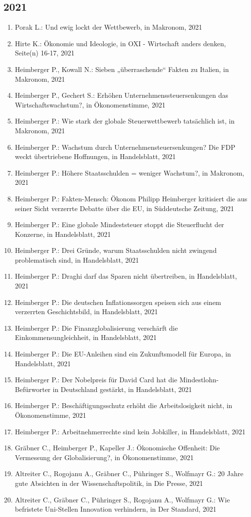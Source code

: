 \subsection*{2021}
\begin{enumerate}
    	 \item Porak L.: Und ewig lockt der Wettbewerb, in Makronom, 2021
	 \item Hirte K.: Ökonomie und Ideologie, in OXI - Wirtschaft anders denken, Seite(n) 16-17, 2021
	 \item Heimberger P., Kowall N.: Sieben „überraschende“ Fakten zu Italien, in Makronom, 2021
	 \item Heimberger P., Gechert S.: Erhöhen Unternehmenssteuersenkungen das Wirtschaftswachstum?, in Ökonomenstimme, 2021
	 \item Heimberger P.: Wie stark der globale Steuerwettbewerb tatsächlich ist, in Makronom, 2021
	 \item Heimberger P.: Wachstum durch Unternehmensteuersenkungen? Die FDP weckt übertriebene Hoffnungen, in Handelsblatt, 2021
	 \item Heimberger P.: Höhere Staatsschulden = weniger Wachstum?, in Makronom, 2021
	 \item Heimberger P.: Fakten-Mensch: Ökonom Philipp Heimberger kritisiert die aus seiner Sicht verzerrte Debatte über die EU, in Süddeutsche Zeitung, 2021
	 \item Heimberger P.: Eine globale Mindeststeuer stoppt die Steuerflucht der Konzerne, in Handelsblatt, 2021
	 \item Heimberger P.: Drei Gründe, warum Staatsschulden nicht zwingend problematisch sind, in Handelsblatt, 2021
	 \item Heimberger P.: Draghi darf das Sparen nicht übertreiben, in Handelsblatt, 2021
	 \item Heimberger P.: Die deutschen Inflationssorgen speisen sich aus einem verzerrten Geschichtsbild, in Handelsblatt, 2021
	 \item Heimberger P.: Die Finanzglobalisierung verschärft die Einkommensungleichheit, in Handelsblatt, 2021
	 \item Heimberger P.: Die EU-Anleihen sind ein Zukunftsmodell für Europa, in Handelsblatt, 2021
	 \item Heimberger P.: Der Nobelpreis für David Card hat die Mindestlohn-Befürworter in Deutschland gestärkt, in Handelsblatt, 2021
	 \item Heimberger P.: Beschäftigungsschutz erhöht die Arbeitslosigkeit nicht, in Ökonomenstimme, 2021
	 \item Heimberger P.: Arbeitnehmerrechte sind kein Jobkiller, in Handelsblatt, 2021
	 \item Gräbner C., Heimberger P., Kapeller J.: Ökonomische Offenheit: Die Vermessung der Globalisierung?, in Ökonomenstimme, 2021
	 \item Altreiter C., Rogojanu A., Gräbner C., Pühringer S., Wolfmayr G.: 20 Jahre gute Absichten in der Wissenschaftspolitik, in Die Presse, 2021
	 \item Altreiter C., Gräbner C., Pühringer S., Rogojanu A., Wolfmayr G.: Wie befristete Uni-Stellen Innovation verhindern, in Der Standard, 2021
\end{enumerate}
